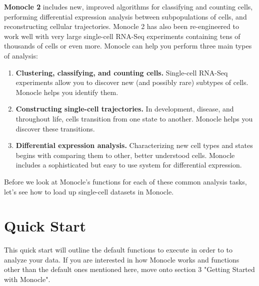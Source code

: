 \documentclass[10pt,oneside]{article}\usepackage[]{graphicx}\usepackage[]{color}
\begin{document}
 \textbf{Monocle 2} includes new, improved algorithms for classifying and counting cells, performing differential expression analysis between subpopulations of cells, and reconstructing cellular trajectories. Monocle 2 has also been re-engineered to work well with very large single-cell RNA-Seq experiments containing tens of thousands of cells or even more.
 \newline
 Monocle can help you perform three main types of analysis:
 \begin{enumerate}
 \item \textbf{Clustering, classifying, and counting cells.} Single-cell RNA-Seq experiments allow you to discover new (and possibly rare) subtypes of cells. Monocle helps you identify them.
 \item \textbf{Constructing single-cell trajectories.} In development, disease, and throughout life, cells transition from one state to another. Monocle helps you discover these transitions.
 \item \textbf{Differential expression analysis.} Characterizing new cell types and states begins with comparing them to other, better understood cells. Monocle includes a sophisticated but easy to use system for differential expression.
 \end{enumerate}
 
 Before we look at Monocle's functions for each of these common analysis tasks, let's see how to load up single-cell datasets in Monocle.
 
\section{Quick Start}
 
 This quick start will outline the default functions to execute in order to to analyze your data. 
 If you are interested in how Monocle works and functions other than the default ones mentioned here, move onto section 3 "Getting Started with Monocle".
 
\end{document}
